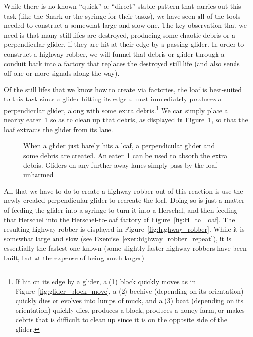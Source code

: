 While there is no known ``quick'' or ``direct'' stable pattern that carries out this task (like the Snark or the syringe for their tasks), we have seen all of the tools needed to construct a somewhat large and slow one. The key observation that we need is that many still lifes are destroyed, producing some chaotic debris or a perpendicular glider, if they are hit at their edge by a passing glider. In order to construct a highway robber, we will funnel that debris or glider through a conduit back into a factory that replaces the destroyed still life (and also sends off one or more signals along the way).

Of the still lifes that we know how to create via factories, the loaf is best-suited to this task since a glider hitting its edge almost immediately produces a perpendicular glider, along with some extra debris.\footnote{If hit on its edge by a glider, a (1) block quickly moves as in Figure~\ref{fig:glider_block_move}, a (2) beehive (depending on its orientation) quickly dies or evolves into lumps of muck, and a (3) boat (depending on its orientation) quickly dies, produces a block, produces a honey farm, or makes debris that is difficult to clean up since it is on the opposite side of the glider.} We can simply place a nearby eater~1 so as to clean up that debris, as displayed in Figure~\ref{fig:glider_loaf_collision}, so that the loaf extracts the glider from its lane.

\begin{figure}[!htb]
	\centering
	\caption{When a glider just barely hits a loaf, a perpendicular glider and some debris are created. An eater~1 can be used to absorb the extra debris. Gliders on any further away lanes simply pass by the loaf unharmed.}
	\label{fig:glider_loaf_collision}
\end{figure}

All that we have to do to create a highway robber out of this reaction is use the newly-created perpendicular glider to recreate the loaf. Doing so is just a matter of feeding the glider into a syringe to turn it into a Herschel, and then feeding that Herschel into the Herschel-to-loaf factory of Figure~\ref{fig:H_to_loaf}. The resulting highway robber is displayed in Figure~\ref{fig:highway_robber}. While it is somewhat large and slow (see Exercise~\ref{exer:highway_robber_repeat}), it is essentially the fastest one known (some slightly faster highway robbers have been built, but at the expense of being much larger).

